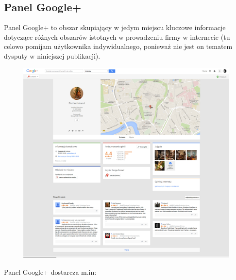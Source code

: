 
\subsection{Panel Google+}
Panel Google+ to obszar skupiający w jedym miejscu kluczowe informacje dotyczące różnych obszarów istotnych w prowadzeniu firmy w internecie (tu celowo pomijam użytkownika indywidualnego, ponieważ nie jest on tematem dysputy w niniejszej publikacji).\\




\begin{figure}[!h]
\centering
    \scalebox{0.21}
    {
        \includegraphics{images/pod-aniolami-google-plus.png}
    }
    \label{fig:sample-google-plus-company-profile-page}
\end{figure}


Panel Google+ dostarcza m.in:

